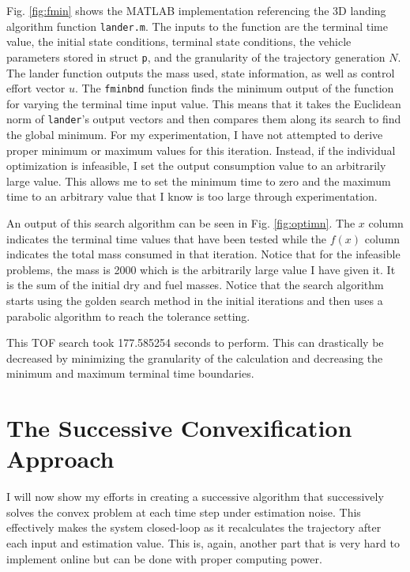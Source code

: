 \documentclass[journal]{new-aiaa}
\begin{document}
\begin{singlespace}
 Fig. \ref{fig:fmin} shows the MATLAB implementation referencing the 3D landing algorithm function \texttt{lander.m}. The inputs to the function are the terminal time value, the initial state conditions, terminal state conditions, the vehicle parameters stored in struct \texttt{p}, and the granularity of the trajectory generation $N$. The lander function outputs the mass used, state information, as well as control effort vector $u$. The \texttt{fminbnd} function finds the minimum output of the function for varying the terminal time input value. This means that it takes the Euclidean norm of \texttt{lander}'s output vectors and then compares them along its search to find the global minimum. For my experimentation, I have not attempted to derive proper minimum or maximum values for this iteration. Instead, if the individual optimization is infeasible, I set the output consumption value to an arbitrarily large value. This allows me to set the minimum time to zero and the maximum time to an arbitrary value that I know is too large through experimentation.

An output of this search algorithm can be seen in Fig. \ref{fig:optimn}. The $x$ column indicates the terminal time values that have been tested while the $f(x)$ column indicates the total mass consumed in that iteration. Notice that for the infeasible problems, the mass is 2000 which is the arbitrarily large value I have given it. It is the sum of the initial dry and fuel masses. Notice that the search algorithm starts using the golden search method in the initial iterations and then uses a parabolic algorithm to reach the tolerance setting.

This TOF search took 177.585254 seconds to perform. This can drastically be decreased by minimizing the granularity of the calculation and decreasing the minimum and maximum terminal time boundaries.

\section{The Successive Convexification Approach}
I will now show my efforts in creating a successive algorithm that successively solves the convex problem at each time step under estimation noise. This effectively makes the system closed-loop as it recalculates the trajectory after each input and estimation value. This is, again, another part that is very hard to implement online but can be done with proper computing power.


\end{singlespace}
\end{document}
